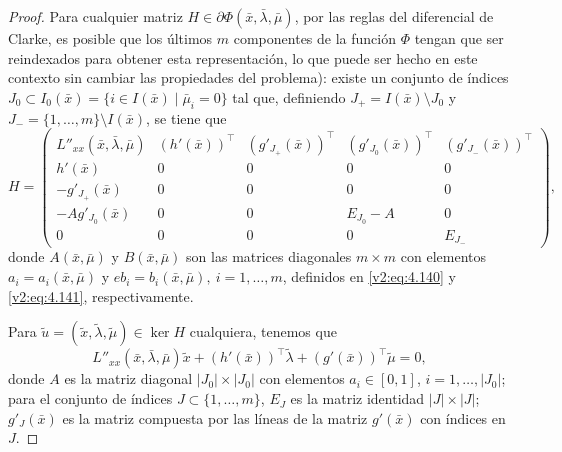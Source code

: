 \begin{proof}
    Para cualquier matriz $H \in \partial \Phi(\bar{x}, \bar{\lambda}, \bar{\mu})$, por las reglas del diferencial de Clarke, es posible que los últimos $m$ componentes de la función $\Phi$ tengan que ser reindexados para obtener esta representación, lo que puede ser hecho en este contexto sin cambiar las propiedades del problema): existe un conjunto de índices $J_0 \subset I_0(\bar{x}) = \{i \in I(\bar{x}) \mid \bar{\mu}_i = 0\}$ tal que, definiendo $J_+ = I(\bar{x}) \setminus J_0$ y $J_- = \{1, \dots, m\} \setminus I(\bar{x})$, se tiene que
    \[
        H = \begin{pmatrix} L''_{xx}(\bar{x}, \bar{\lambda}, \bar{\mu}) & (h'(\bar{x}))^\top & (g'_{J_+}(\bar{x}))^\top & (g'_{J_0}(\bar{x}))^\top & (g'_{J_-}(\bar{x}))^\top \\
        h'(\bar{x}) & 0 & 0 & 0 & 0 \\
        -g'_{J_+}(\bar{x}) & 0 & 0 & 0 & 0 \\
        -A g'_{J_0}(\bar{x}) & 0 & 0 & E_{J_0} - A & 0 \\
        0 & 0 & 0 & 0 & E_{J_-} \end{pmatrix},
    \]
    donde $A(\bar{x}, \bar{\mu})$ y $B(\bar{x}, \bar{\mu})$ son las matrices diagonales $m \times m$ con elementos $a_i = a_i(\bar{x}, \bar{\mu})$ y $e b_i = b_i(\bar{x}, \bar{\mu}), \ i = 1, \dots, m$, definidos en \eqref{v2:eq:4.140} y \eqref{v2:eq:4.141}, respectivamente.
    
    Para $\tilde{u} = (\tilde{x}, \tilde{\lambda}, \tilde{\mu}) \in \ker H$ cualquiera, tenemos que
    \begin{equation}
        L''_{xx}(\bar{x}, \bar{\lambda}, \bar{\mu})\tilde{x} + (h'(\bar{x}))^\top \tilde{\lambda} + (g'(\bar{x}))^\top \tilde{\mu} = 0,
        \label{v2:eq:4.153}
    \end{equation}
    donde $A$ es la matriz diagonal $|J_0| \times |J_0|$ con elementos $a_i \in [0, 1]$, $i = 1, \dots, |J_0|$; para el conjunto de índices $J \subset \{1, \dots, m\}$, $E_J$ es la matriz identidad $|J| \times |J|$; $g'_J(\bar{x})$ es la matriz compuesta por las líneas de la matriz $g'(\bar{x})$ con índices en $J$.
    

\end{proof}
